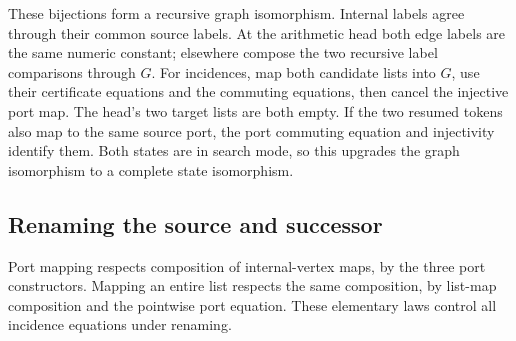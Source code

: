 






These bijections form a recursive graph isomorphism. Internal labels agree
through their common source labels. At the arithmetic head both edge labels
are the same numeric constant; elsewhere compose the two recursive label
comparisons through $G$. For incidences, map both candidate lists into $G$,
use their certificate equations and the commuting equations, then cancel the
injective port map. The head's two target lists are both empty.
If the two resumed tokens also map to the same source port, the port commuting
equation and injectivity identify them. Both states are in search mode, so this
upgrades the graph isomorphism to a complete state isomorphism.



\subsection{Renaming the source and successor}

Port mapping respects composition of internal-vertex maps, by the three
port constructors. Mapping an entire list respects the same composition, by
list-map composition and the pointwise port equation. These elementary laws
control all incidence equations under renaming.



